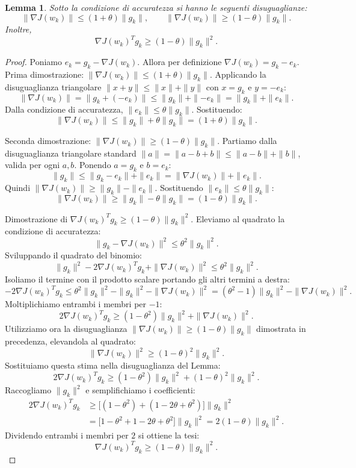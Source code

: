 \documentclass[italian, a4paper, twoside, binding=6mm]{sapthesis}
\newtheorem{lemma}{Lemma}
\begin{document}
\begin{lemma}\label{lem:accuratezza}
  Sotto la condizione di accuratezza si hanno le seguenti disuguaglianze:
  \[
  \|\nabla J(w_k)\| \leq (1+\theta)\|g_k\|, \qquad
  \|\nabla J(w_k)\| \geq (1-\theta)\|g_k\|.
  \]
  Inoltre,
  \[
  \nabla J(w_k)^T g_k \geq (1-\theta)\|g_k\|^2.
  \]
\end{lemma}
\begin{proof}
  Poniamo $e_k = g_k - \nabla J(w_k)$. Allora per definizione $\nabla J(w_k) = g_k - e_k$.
  Prima dimostrazione: $\|\nabla J(w_k)\| \leq (1+\theta)\|g_k\|$.
  Applicando la disuguaglianza triangolare $\|x+y\| \leq \|x\| + \|y\|$ con $x = g_k$ e $y = -e_k$:
  \[
  \|\nabla J(w_k)\| = \|g_k + (-e_k)\| \leq \|g_k\| + \|{-e_k}\| = \|g_k\| + \|e_k\|.
  \]
  Dalla condizione di accuratezza, $\|e_k\| \leq \theta \|g_k\|$. Sostituendo:
  \[
  \|\nabla J(w_k)\| \leq \|g_k\| + \theta \|g_k\| = (1+\theta)\|g_k\|.
  \]

  Seconda dimostrazione: $\|\nabla J(w_k)\| \geq (1-\theta)\|g_k\|$.
  Partiamo dalla disuguaglianza triangolare standard $\|a\|=\|a-b+b\| \leq \|a-b\| + \|b\|$, valida per ogni $a,b$. Ponendo $a = g_k$ e $b = e_k$:
  \[
  \|g_k\| \leq \|g_k - e_k\| + \|e_k\| = \|\nabla J(w_k)\| + \|e_k\|.
  \]
  Quindi $\|\nabla J(w_k)\| \geq \|g_k\| - \|e_k\|$. Sostituendo $\|e_k\| \leq \theta \|g_k\|$:
  \[
  \|\nabla J(w_k)\| \geq \|g_k\| - \theta \|g_k\| = (1-\theta)\|g_k\|.
  \]

  Dimostrazione di $\nabla J(w_k)^T g_k \geq (1-\theta)\|g_k\|^2$.
  Eleviamo al quadrato la condizione di accuratezza:
  \[
  \|g_k - \nabla J(w_k)\|^2 \leq \theta^2 \|g_k\|^2.
  \]
  Sviluppando il quadrato del binomio:
  \[
  \|g_k\|^2 - 2\nabla J(w_k)^T g_k + \|\nabla J(w_k)\|^2 \leq \theta^2 \|g_k\|^2.
  \]
  Isoliamo il termine con il prodotto scalare portando gli altri termini a destra:
  \[
  -2\nabla J(w_k)^T g_k \leq \theta^2 \|g_k\|^2 - \|g_k\|^2 - \|\nabla J(w_k)\|^2 = (\theta^2 - 1)\|g_k\|^2 - \|\nabla J(w_k)\|^2.
  \]
  Moltiplichiamo entrambi i membri per $-1$:
  \[
  2\nabla J(w_k)^T g_k \geq (1 - \theta^2)\|g_k\|^2 + \|\nabla J(w_k)\|^2.
  \]
  Utilizziamo ora la disuguaglianza $\|\nabla J(w_k)\| \geq (1-\theta)\|g_k\|$ dimostrata in precedenza, elevandola al quadrato:
  \[
  \|\nabla J(w_k)\|^2 \geq (1-\theta)^2 \|g_k\|^2.
  \]
  Sostituiamo questa stima nella disuguaglianza del Lemma:
  \[
  2\nabla J(w_k)^T g_k \geq (1 - \theta^2)\|g_k\|^2 + (1-\theta)^2 \|g_k\|^2.
  \]
  Raccogliamo $\|g_k\|^2$ e semplifichiamo i coefficienti:
  \[
  \begin{aligned}
  2\nabla J(w_k)^T g_k
  &\geq \bigl[(1 - \theta^2) + (1 - 2\theta + \theta^2)\bigr] \|g_k\|^2 \\
  &= \bigl[1 - \theta^2 + 1 - 2\theta + \theta^2\bigr] \|g_k\|^2
   = 2(1 - \theta) \|g_k\|^2.
  \end{aligned}
  \]
  Dividendo entrambi i membri per $2$ si ottiene la tesi:
  \[
  \nabla J(w_k)^T g_k \geq (1-\theta) \|g_k\|^2.
  \]
\end{proof}
\end{document}
